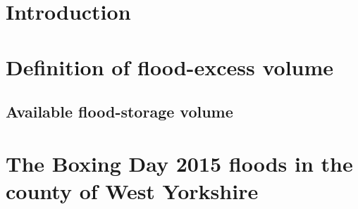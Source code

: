 \documentclass[11pt,a4paper]{article}
\begin{document}
\newpage
\section{Introduction}

\section{Definition of flood-excess volume}
\subsection{Available flood-storage volume}



\section{The Boxing Day 2015 floods in the county of West Yorkshire}
\end{document}
